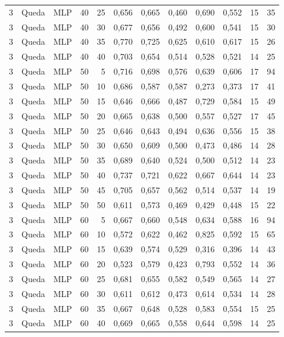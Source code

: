 \begin{longtable}{@{}rllrrrrrrrrr@{}}
3 & Queda & MLP & 40 & 25 & 0,656 & 0,665 & 0,460 & 0,690 & 0,552 & 15 & 35 \\
3 & Queda & MLP & 40 & 30 & 0,677 & 0,656 & 0,492 & 0,600 & 0,541 & 15 & 30 \\
3 & Queda & MLP & 40 & 35 & 0,770 & 0,725 & 0,625 & 0,610 & 0,617 & 15 & 26 \\
3 & Queda & MLP & 40 & 40 & 0,703 & 0,654 & 0,514 & 0,528 & 0,521 & 14 & 25 \\
3 & Queda & MLP & 50 & 5 & 0,716 & 0,698 & 0,576 & 0,639 & 0,606 & 17 & 94 \\
3 & Queda & MLP & 50 & 10 & 0,686 & 0,587 & 0,587 & 0,273 & 0,373 & 17 & 41 \\
3 & Queda & MLP & 50 & 15 & 0,646 & 0,666 & 0,487 & 0,729 & 0,584 & 15 & 49 \\
3 & Queda & MLP & 50 & 20 & 0,665 & 0,638 & 0,500 & 0,557 & 0,527 & 17 & 45 \\
3 & Queda & MLP & 50 & 25 & 0,646 & 0,643 & 0,494 & 0,636 & 0,556 & 15 & 38 \\
3 & Queda & MLP & 50 & 30 & 0,650 & 0,609 & 0,500 & 0,473 & 0,486 & 14 & 28 \\
3 & Queda & MLP & 50 & 35 & 0,689 & 0,640 & 0,524 & 0,500 & 0,512 & 14 & 23 \\
3 & Queda & MLP & 50 & 40 & 0,737 & 0,721 & 0,622 & 0,667 & 0,644 & 14 & 23 \\
3 & Queda & MLP & 50 & 45 & 0,705 & 0,657 & 0,562 & 0,514 & 0,537 & 14 & 19 \\
3 & Queda & MLP & 50 & 50 & 0,611 & 0,573 & 0,469 & 0,429 & 0,448 & 15 & 22 \\
3 & Queda & MLP & 60 & 5 & 0,667 & 0,660 & 0,548 & 0,634 & 0,588 & 16 & 94 \\
3 & Queda & MLP & 60 & 10 & 0,572 & 0,622 & 0,462 & 0,825 & 0,592 & 15 & 65 \\
3 & Queda & MLP & 60 & 15 & 0,639 & 0,574 & 0,529 & 0,316 & 0,396 & 14 & 43 \\
3 & Queda & MLP & 60 & 20 & 0,523 & 0,579 & 0,423 & 0,793 & 0,552 & 14 & 36 \\
3 & Queda & MLP & 60 & 25 & 0,681 & 0,655 & 0,582 & 0,549 & 0,565 & 14 & 27 \\
3 & Queda & MLP & 60 & 30 & 0,611 & 0,612 & 0,473 & 0,614 & 0,534 & 14 & 28 \\
3 & Queda & MLP & 60 & 35 & 0,667 & 0,648 & 0,528 & 0,583 & 0,554 & 15 & 25 \\
3 & Queda & MLP & 60 & 40 & 0,669 & 0,665 & 0,558 & 0,644 & 0,598 & 14 & 25 \\

\end{longtable}
